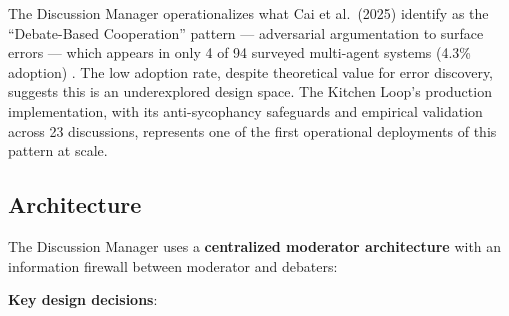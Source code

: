 \documentclass[11pt,a4paper]{article}
\begin{document}
The Discussion Manager operationalizes what Cai et al.~(2025) identify as the ``Debate-Based Cooperation'' pattern --- adversarial argumentation to surface errors --- which appears in only 4 of 94 surveyed multi-agent systems (4.3\% adoption) \cite{cai2025}. The low adoption rate, despite theoretical value for error discovery, suggests this is an underexplored design space. The Kitchen Loop's production implementation, with its anti-sycophancy safeguards and empirical validation across 23 discussions, represents one of the first operational deployments of this pattern at scale.

\subsection{Architecture}\label{sec:architecture}

The Discussion Manager uses a \textbf{centralized moderator architecture} with an information firewall between moderator and debaters:

\begin{figure}[h]
\centering
{}
\end{figure}

\textbf{Key design decisions}:
\end{document}
